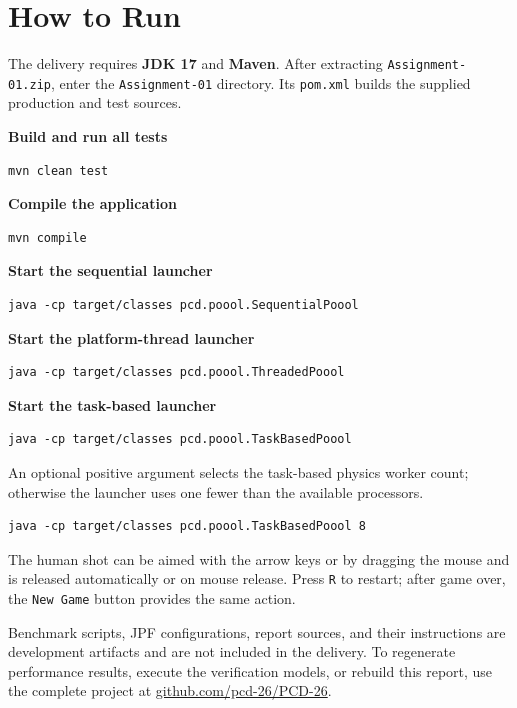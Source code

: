 \clearpage
\section{How to Run}

The delivery requires \textbf{JDK 17} and \textbf{Maven}. After extracting
\texttt{Assignment-01.zip}, enter the \texttt{Assignment-01} directory. Its
\texttt{pom.xml} builds the supplied production and test sources.

\textbf{Build and run all tests}
\begin{verbatim}
mvn clean test
\end{verbatim}

\textbf{Compile the application}
\begin{verbatim}
mvn compile
\end{verbatim}

\textbf{Start the sequential launcher}
\begin{verbatim}
java -cp target/classes pcd.poool.SequentialPoool
\end{verbatim}

\textbf{Start the platform-thread launcher}
\begin{verbatim}
java -cp target/classes pcd.poool.ThreadedPoool
\end{verbatim}

\textbf{Start the task-based launcher}
\begin{verbatim}
java -cp target/classes pcd.poool.TaskBasedPoool
\end{verbatim}

An optional positive argument selects the task-based physics worker count;
otherwise the launcher uses one fewer than the available processors.
\begin{verbatim}
java -cp target/classes pcd.poool.TaskBasedPoool 8
\end{verbatim}

The human shot can be aimed with the arrow keys or by dragging the mouse and is
released automatically or on mouse release. Press \texttt{R} to restart; after
game over, the \texttt{New Game} button provides the same action.

Benchmark scripts, JPF configurations, report sources, and their instructions
are development artifacts and are not included in the delivery. To regenerate
performance results, execute the verification models, or rebuild this report,
use the complete project at
\href{https://github.com/pcd-26/PCD-26}{github.com/pcd-26/PCD-26}.
